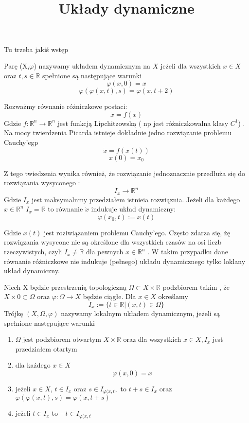 \title{Układy dynamiczne}

Tu trzeba jakiś wstęp 

\begin{definition}
 \label{ukladDynamiczny}
 Parę (X,$\varphi$) nazywamy układem dynamicznym na $X$ jeżeli dla wszystkich  $ x \in X $  oraz $t,s \in \mathbb R $ spełnione są następujące warunki
    $$  \varphi(x,0) = x$$
    $$ \varphi(\varphi(x,t),s) = \varphi(x,t+2) $$



    



\end{definition}

    
Rozważmy równanie różniczkowe postaci:
	$$ \dot{x} = f(x) $$
Gdzie $ f : \mathbb R^n \to \mathbb R^n $ jest funkcją Lipchitzowską ( np jest różniczkowalna klasy $C^1$) . Na mocy twierdzenia Picarda istnieje dokładnie jedno rozwiązanie problemu Cauchy'egp
  $$ \dot{x} = f(x(t)) $$
  $$ x(0) = x_0 $$

Z tego twiedzenia wynika również, że rozwiązanie jednoznacznie przedłuża się do rozwiązania wysyconego :
 $$ I_x \to \mathbb R^n $$ 
 Gdzie $ I_x$ jest maksymalnmy przedziałem istnieia rozwiąznia. Jeżeli dla każdego  $x \in \mathbb R^n $ 
 $ I_x = \mathbb R $ to równanie  $ \dot{x} $ indukuje układ dynamiczny:
  $$
    \varphi(x_0,t) := x(t)
  $$
  
  Gdzie $x(t) $ jest roziwiązaniem problemu Cauchy'ego.
  Często zdarza się, żę rozwiązania wysycone nie są określone dla wszystkich czasów na osi liczb rzeczywistych, czyli $ I_x \neq \mathbb R $ dla 
  pewnych $x \in \mathbb R^n $ . W takim przypadku dane równanie różniczkowe nie indukuje (pełnego) układu dynamicznego tylko 
  loklany układ dynamiczny.

 \begin{definition}
  \label{lokalnyUkladDynamiczny}
  
    Niech X będzie przestrzenią topologiczną $ \Omega \subset X \times \mathbb R$ podzbiorem takim , że  $ X \times {0} \subset \Omega $ oraz 
    $ \varphi : \Omega \to X $ będzie ciągłe. Dla  $ x \in X $ określamy 
	$$ I_x := \{ t \in \mathbb R | (x,t) \in \Omega \}$$
    Trójkę $(X,\Omega,\varphi) $ nazywamy lokalnym układem dynamicznym, jeżeli są spełnione następujące warunki
    
    \begin{enumerate}
     \item $\Omega $ jest podzbiorem otwartym $ X\times \mathbb R $ oraz dla wszystkich $ x \in X , I_x $ jest przedziałem otartym
     \item dla każdego $x\in X$
	$$ \varphi(x,0) = x $$
     \item jeżeli $x \in X $, $ t \in I_x$ oraz $ s\in I_{\varphi(x,t},$ to $ t+s \in I_x $ oraz $ \varphi(\varphi(x,t),s) = \varphi(x,t+s) $
     \item jeżeli $ t\in I_x $ to $-t \in I_{\varphi(x,t} $
    \end{enumerate}

 \end{definition}

